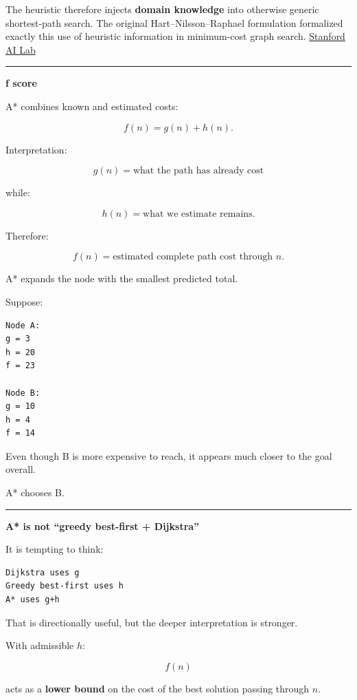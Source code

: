 The heuristic therefore injects \textbf{domain knowledge} into otherwise generic shortest-path search. The original Hart--Nilsson--Raphael formulation formalized exactly this use of heuristic information in minimum-cost graph search. \href{https://ai.stanford.edu/~nilsson/OnlinePubs-Nils/PublishedPapers/astar.pdf?utm_source=chatgpt.com}{Stanford AI Lab}

\begin{center}\rule{0.5\linewidth}{0.5pt}\end{center}

\textbf{f score}

A* combines known and estimated costs:

\[
\boxed{
f(n)=g(n)+h(n).
}
\]

Interpretation:

\[
g(n)
=
\text{what the path has already cost}
\]

while:

\[
h(n)
=
\text{what we estimate remains}.
\]

Therefore:

\[
f(n)
=
\text{estimated complete path cost through }n.
\]

A* expands the node with the smallest predicted total.

Suppose:

\begin{verbatim}
Node A:
g = 3
h = 20
f = 23

Node B:
g = 10
h = 4
f = 14
\end{verbatim}

Even though B is more expensive to reach, it appears much closer to the goal overall.

A* chooses B.

\begin{center}\rule{0.5\linewidth}{0.5pt}\end{center}

\textbf{A* is not ``greedy best-first + Dijkstra''}

It is tempting to think:

\begin{verbatim}
Dijkstra uses g
Greedy best-first uses h
A* uses g+h
\end{verbatim}

That is directionally useful, but the deeper interpretation is stronger.

With admissible \(h\):

\[
f(n)
\]

acts as a \textbf{lower bound} on the cost of the best solution passing through \(n\).

